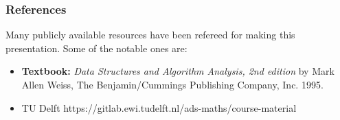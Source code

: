 \begin{frame}\frametitle{References}
Many publicly available resources have been refereed for making this presentation. Some of the notable ones are:
\footnotesize
\begin{itemize}
\item {\bf Textbook: }
{\em Data Structures and Algorithm Analysis, 2nd edition} by Mark Allen Weiss,
The Benjamin/Cummings Publishing Company, Inc.
1995. 
\item TU Delft https://gitlab.ewi.tudelft.nl/ads-maths/course-material 
\end{itemize}
\end{frame}
